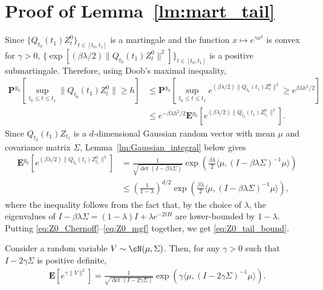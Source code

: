 \documentclass[final,12pt]{colt2018}
\numberwithin{equation}{section}
\numberwithin{equation}{section}
\def\E{\mathbf{E}}
\def\PP{\mathbf{P}}
\def\ave#1{\langle #1 \rangle}
\begin{document}
   \section{Proof of Lemma~\ref{lm:mart_tail}}
   \label{app:mart_tail}
   
   \setcounter{theorem}{0}
   \renewcommand{\thetheorem}{\Alph{section}.\arabic{theorem}}
   
Since $\{Q_{t_0}(t_1)Z^0_t\}_{t \in [t_0,t_1]}$ is a martingale and the function $x \mapsto e^{\gamma x^2}$ is convex for $\gamma > 0$, $\{\exp[(\beta\lambda/2)\|Q_{t_0}(t_1)Z^0_t\|^2]\}_{t \in [t_0,t_1]}$ is a positive submartingale. Therefore, using Doob's maximal inequality,
    	\begin{align}
    		\PP^{y_0}\left[\sup_{t_0 \le t \le t_1} \|Q_{t_0}(t_1)Z^0_t\| \ge h\right] &\le \PP^{y_0} \left[\sup_{t_0 \le t \le t_1} e^{(\beta\lambda/2)\|Q_{t_0}(t_1)Z^0_t\|^2} \ge e^{\beta\lambda h^2/2}\right] \nonumber\\
    		&\le e^{-\beta\lambda h^2/2} \E^{y_0} \left[e^{(\beta\lambda/2)\|Q_{t_0}(t_1)Z^0_{t_1}\|^2}\right].\label{eq:Z0_Chernoff}
    	\end{align}
Since $Q_{t_0}(t_1)Z_{t_1}$ is a $d$-dimensional Gaussian random vector with mean $\mu$ and covariance matrix $\Sigma$, Lemma~\ref{lm:Gaussian_integral} below gives
    \begin{align}
    	\E^{y_0} \left[e^{(\beta\lambda/2)\|Q_{t_0}(t_1)Z^0_{t_1}\|^2}\right] 
    	&= \frac{1}{\sqrt{\det(I-\beta\lambda\Sigma)}} \exp\left(\frac{\beta\lambda}{2} \ave{\mu,(I-\beta\lambda\Sigma)^{-1}\mu}\right) \nonumber\\
		&\le \left(\frac{1}{1-\lambda}\right)^{d/2}\exp\left(\frac{\beta\lambda}{2} \ave{\mu,(I-\beta\lambda\Sigma)^{-1}\mu}\right), \label{eq:Z0_mgf}
    \end{align}
where the inequality follows from the fact that, by the choice of $\lambda$, the eigenvalues of $I - \beta\lambda \Sigma = (1-\lambda)I + \lambda e^{-2tH}$ are lower-bounded by $1-\lambda$. Putting \eqref{eq:Z0_Chernoff}--\eqref{eq:Z0_mgf} together, we get \eqref{eq:Z0_tail_bound}.

    \begin{lemma}\label{lm:Gaussian_integral}
    Consider a random variable $V \sim \cN(\mu,\Sigma)$. Then, for any $\gamma > 0$ such that $I - 2\gamma\Sigma$ is positive definite,
    \begin{align}\label{eq:Gaussian_integral}
    	\E[e^{\gamma\|V\|^2}] = \frac{1}{\sqrt{\det (I - 2\gamma\Sigma)}} \exp\left(\gamma \ave{\mu,(I-2\gamma\Sigma)^{-1}\mu}\right).
    \end{align}
    \end{lemma}
\end{document}
